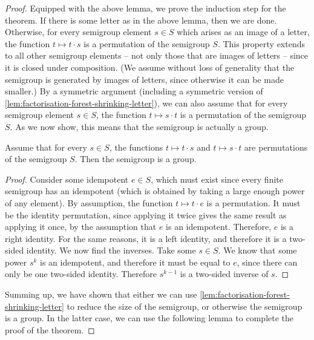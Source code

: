 \begin{proof}
Equipped with the above lemma, we prove the induction step for the theorem. If there is some letter as in the above lemma, then we are done. Otherwise, for every semigroup element $s \in S$ which arises as an image of a letter, the function $t \mapsto t \cdot s$ is a permutation of the semigroup $S$. This property extends to all other semigroup elements -- not only those that are images of letters -- since it is closed under composition. (We assume without loss of generality that the semigroup is generated by images of letters, since otherwise it can be made smaller.) By a symmetric argument (including a symmetric version of \cref{lem:factorisation-forest-shrinking-letter}), we can also assume that for every semigroup element $s \in S$,  the function $t \mapsto s \cdot t$ is a permutation of the semigroup $S$. As we now show, this means that the semigroup is actually a group.

\begin{lemma}\label{lem:semigroup-is-group}
    Assume that for every $s \in S$, the functions $t \mapsto t \cdot s$ and $t \mapsto s \cdot t$ are permutations of the semigroup $S$. Then the semigroup is a group.
\end{lemma}
\begin{proof}
    Consider some idempotent $e \in S$, which must exist since every finite semigroup has an idempotent (which is obtained by taking a large enough power of any element). By assumption, the function $t \mapsto t \cdot e$ is a permutation. It must be the identity permutation, since applying it twice gives the same result as applying it once, by the assumption that $e$ is an idempotent. Therefore, $e$ is a right identity. For the same reasons, it is a left identity, and therefore it is a two-sided identity. We now find the inverses. Take some $s \in S$. We know that some power $s^k$ is an idempotent, and therefore it must be equal to $e$, since there can only be one two-sided identity. Therefore $s^{k-1}$ is a two-sided inverse of $s$. 
\end{proof}

Summing up, we have shown that either we can use \cref{lem:factorisation-forest-shrinking-letter} to reduce the size of the semigroup, or otherwise the semigroup is a group. In the latter case, we can use the following lemma to complete the proof of the theorem.


\end{proof}
